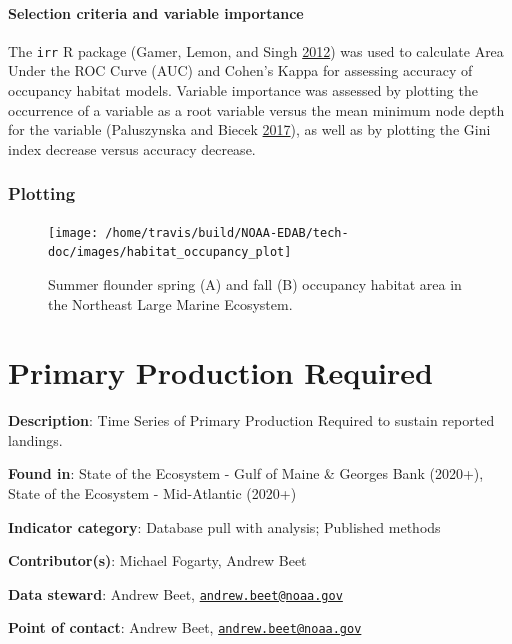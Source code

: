 \documentclass[
]{book}
\begin{document}
\hypertarget{selection-criteria-and-variable-importance}{%
\subsubsection{Selection criteria and variable importance}\label{selection-criteria-and-variable-importance}}

The \texttt{irr} R package (Gamer, Lemon, and Singh \protect\hyperlink{ref-irr}{2012}) was used to calculate Area Under the ROC Curve (AUC) and Cohen's Kappa for assessing accuracy of occupancy habitat models. Variable importance was assessed by plotting the occurrence of a variable as a root variable versus the mean minimum node depth for the variable (Paluszynska and Biecek \protect\hyperlink{ref-randomForestExplainer}{2017}), as well as by plotting the Gini index decrease versus accuracy decrease.

\hypertarget{plotting-19}{%
\subsection{Plotting}\label{plotting-19}}

\begin{figure}[H]
\texttt{[image: /home/travis/build/NOAA-EDAB/tech-doc/images/habitat\_occupancy\_plot]} \caption{Summer flounder spring (A) and fall (B) occupancy habitat area in the Northeast Large Marine Ecosystem. }\label{fig:occupancy-MAB}
\end{figure}

\hypertarget{primary-production-required}{%
\chapter{Primary Production Required}\label{primary-production-required}}

\textbf{Description}: Time Series of Primary Production Required to sustain reported landings.

\textbf{Found in}: State of the Ecosystem - Gulf of Maine \& Georges Bank (2020+), State of the Ecosystem - Mid-Atlantic (2020+)

\textbf{Indicator category}: Database pull with analysis; Published methods

\textbf{Contributor(s)}: Michael Fogarty, Andrew Beet

\textbf{Data steward}: Andrew Beet, \href{mailto:andrew.beet@noaa.gov}{\nolinkurl{andrew.beet@noaa.gov}}

\textbf{Point of contact}: Andrew Beet, \href{mailto:andrew.beet@noaa.gov}{\nolinkurl{andrew.beet@noaa.gov}}
\end{document}

